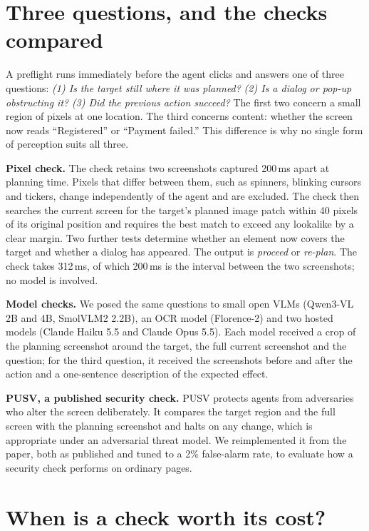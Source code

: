 \documentclass[10pt]{article}
\begin{document}
\section{Three questions, and the checks compared}
\label{sec:checks}

A preflight runs immediately before the agent clicks and answers one of three questions: \emph{(1) Is the target still where it was planned?} \emph{(2) Is a dialog or pop-up obstructing it?} \emph{(3) Did the previous action succeed?} The first two concern a small region of pixels at one location. The third concerns content: whether the screen now reads ``Registered'' or ``Payment failed.'' This difference is why no single form of perception suits all three.

\textbf{Pixel check.} The check retains two screenshots captured 200\,ms apart at planning time. Pixels that differ between them, such as spinners, blinking cursors and tickers, change independently of the agent and are excluded. The check then searches the current screen for the target's planned image patch within 40 pixels of its original position and requires the best match to exceed any lookalike by a clear margin. Two further tests determine whether an element now covers the target and whether a dialog has appeared. The output is \emph{proceed} or \emph{re-plan}. The check takes 312\,ms, of which 200\,ms is the interval between the two screenshots; no model is involved.

\textbf{Model checks.} We posed the same questions to small open VLMs (Qwen3-VL 2B and 4B, SmolVLM2 2.2B), an OCR model (Florence-2) and two hosted models (Claude Haiku 5.5 and Claude Opus 5.5). Each model received a crop of the planning screenshot around the target, the full current screenshot and the question; for the third question, it received the screenshots before and after the action and a one-sentence description of the expected effect.

\textbf{PUSV, a published security check.} PUSV \citep{pusv} protects agents from adversaries who alter the screen deliberately. It compares the target region and the full screen with the planning screenshot and halts on any change, which is appropriate under an adversarial threat model. We reimplemented it from the paper, both as published and tuned to a 2\% false-alarm rate, to evaluate how a security check performs on ordinary pages.

\section{When is a check worth its cost?}
\label{sec:math}
\end{document}

